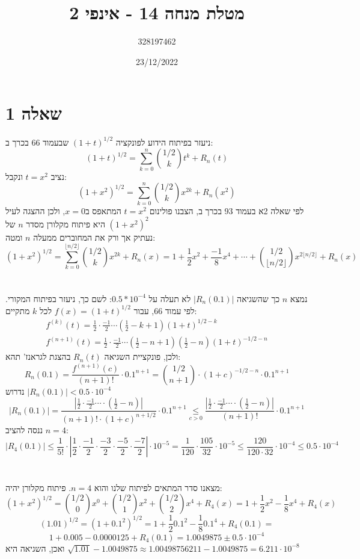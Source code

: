 \documentclass{article}
\title{מטלת מנחה 14 - אינפי 2}
\author{328197462}
\date{23/12/2022}
\newcommand\underrel[2]{\mathrel{\mathop{#2}\limits_{#1}}}
\begin{document}
\long{}
\maketitle

\section*{שאלה 1}

ניעזר בפיתוח הידוע לפונקציה $(1+t)^{1/2}$
שבעמוד 66 בכרך ב:
\[
    (1+t)^{1/2} = \sum_{k=0}^n \binom{1/2}{k}t^k+R_n(t)
\]
נציב $t=x^2$ ונקבל:
\[
    (1+x^2)^{1/2} = \sum_{k=0}^n \binom{1/2}{k}x^{2k}+R_n(x^2)
\]
לפי שאלה 2א בעמוד 93 בכרך ב, הצבנו פולינום $t=x^2$ המתאפס ב$x=0$,
ולכן ההצגה לעיל היא פיתוח מקלורן מסדר $n$ של $(1+x^2)^2$\\
נעתיק אך ורק את המחוברים ממעלה $n$ ומטה:
\[
    (1+x^2)^{1/2} =
    \sum_{k=0}^{\lfloor n/2 \rfloor} \binom{1/2}{k}x^{2k} + R_n(x) = 1 + \frac{1}{2}x^2+\frac{-1}{8}x^4+\cdots + \binom{1/2}{\lfloor n/2 \rfloor}x^{2\lfloor n/2 \rfloor} + R_n(x)
\]
\\\\
נמצא $n$ כך שהשגיאה $|R_n(0.1)|$ לא תעלה על $0.5*10^{-4}$:
לשם כך, ניעזר בפיתוח המקורי. לפי עמוד 66, עבור $f(x)=(1+t)^{1/2}$ לכל $k$ מתקיים:
\[
    \begin{matrix}
        f^{(k)}(t)=\frac{1}{2}\cdot \frac{-1}{2} \cdots (\frac{1}{2}-k+1)(1+t)^{1/2-k} \\
        f^{(n+1)}(t)=\frac{1}{2}\cdot \frac{-1}{2} \cdots (\frac{1}{2}-n+1)(\frac{1}{2}-n)(1+t)^{-1/2-n}
    \end{matrix}
\]
ולכן, פונקציית השגיאה $R_n(t)$ בהצגת לגראנז' תהא:
\[
    R_n(0.1) = \frac{f^{(n+1)}(c)}{(n+1)!} \cdot 0.1^{n+1}=
    \binom{1/2}{n+1}\cdot (1+c)^{-1/2-n} \cdot 0.1^{n+1}
\]
נדרוש $|R_n(0.1)|<0.5\cdot 10^{-4}$
\[
    |R_n(0.1)| =
    \frac{|\frac{1}{2} \cdot \frac{-1}{2} \cdots \cdot (\frac{1}{2}-n)|}{(n+1)!\cdot (1+c)^{n+1/2}} \cdot 0.1^{n+1} \underrel{c>0}{\leq}
    \frac{|\frac{1}{2} \cdot \frac{-1}{2} \cdots \cdot (\frac{1}{2}-n)|}{(n+1)!} \cdot 0.1^{n+1}
\]
ננסה להציב $n=4$:
\[
    |R_4(0.1)|\leq \frac{1}{5!} \cdot |\frac{1}{2}\cdot \frac{-1}{2}\cdot \frac{-3}{2}\cdot \frac{-5}{2} \cdot \frac{-7}{2}| \cdot 10^{-5} =
    \frac{1}{120} \cdot \frac{105}{32} \cdot 10^{-5} \leq
    \frac{120}{120\cdot 32} \cdot 10^{-4} \leq 0.5 \cdot 10^{-4}
\]
\\\\
מצאנו סדר המתאים לפיתוח שלנו והוא $n=4$. פיתוח מקלורן יהיה:
\[
    (1+x^2)^{1/2} = \binom{1/2}{0}x^0+\binom{1/2}{1}x^2+\binom{1/2}{2}x^4 + R_4(x) =
    1+\frac{1}{2}x^2-\frac{1}{8}x^4+R_4(x)
\]
\[
    (1.01)^{1/2}=(1+0.1^2)^{1/2}=1+\frac{1}{2}0.1^2 - \frac{1}{8}0.1^4+R_4(0.1) =
\]
\[
    1 + 0.005 - 0.0000125 + R_4(0.1) = 1.0049875 \pm 0.5 \cdot 10^{-4}
\]
ואכן, השגיאה היא $\sqrt{1.01}-1.0049875\approx 1.00498756211 - 1.0049875 = 6.211\cdot 10^{-8}$
\end{document}
